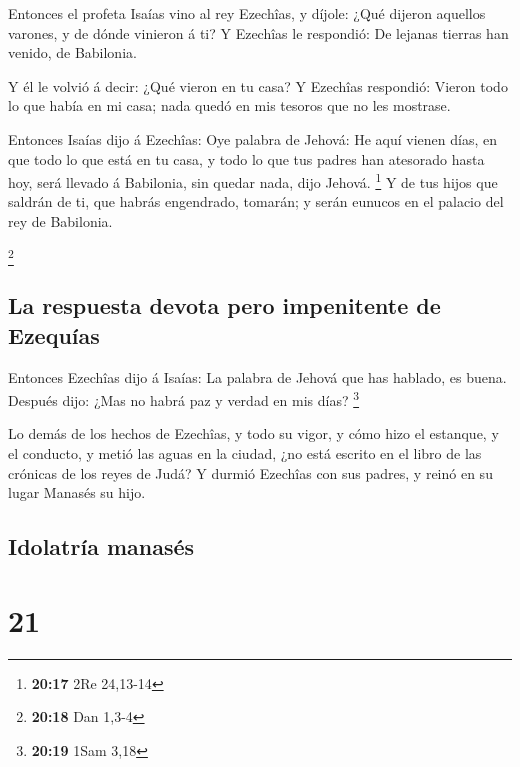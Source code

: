  Entonces el profeta Isaías vino al rey Ezechîas, y
díjole: ¿Qué dijeron aquellos varones, y de dónde vinieron á ti? Y
Ezechîas le respondió: De lejanas tierras han venido, de Babilonia.

 Y él le volvió á decir: ¿Qué vieron en tu casa? Y
Ezechîas respondió: Vieron todo lo que había en mi casa; nada quedó en
mis tesoros que no les mostrase.

 Entonces Isaías dijo á Ezechîas: Oye palabra de Jehová:
 He aquí vienen días, en que todo lo que está en tu casa,
y todo lo que tus padres han atesorado hasta hoy, será llevado á
Babilonia, sin quedar nada, dijo Jehová. \footnote{\textbf{20:17} 2Re
  24,13-14}  Y de tus hijos que saldrán de ti, que habrás
engendrado, tomarán; y serán eunucos en el palacio del rey de Babilonia.

\footnote{\textbf{20:18} Dan 1,3-4}

\hypertarget{la-respuesta-devota-pero-impenitente-de-ezequuxedas}{%
\subsection{La respuesta devota pero impenitente de
Ezequías}\label{la-respuesta-devota-pero-impenitente-de-ezequuxedas}}

 Entonces Ezechîas dijo á Isaías: La palabra de Jehová
que has hablado, es buena. Después dijo: ¿Mas no habrá paz y verdad en
mis días? \footnote{\textbf{20:19} 1Sam 3,18}

 Lo demás de los hechos de Ezechîas, y todo su vigor, y
cómo hizo el estanque, y el conducto, y metió las aguas en la ciudad,
¿no está escrito en el libro de las crónicas de los reyes de Judá?
 Y durmió Ezechîas con sus padres, y reinó en su lugar
Manasés su hijo.

\hypertarget{idolatruxeda-manasuxe9s}{%
\subsection{Idolatría manasés}\label{idolatruxeda-manasuxe9s}}

\hypertarget{section-20}{%
\section{21}\label{section-20}}


